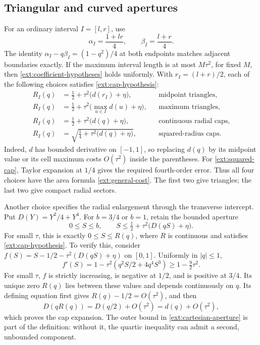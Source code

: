 \subsection{Triangular and curved apertures}
\label{ext:apertures}

For an ordinary interval $I=[l,r]$, use
\begin{equation}\label{ext:ordinary-secants}
 \alpha_I=\frac{1+lr}{4},\qquad \beta_I=\frac{l+r}{4}.
\end{equation}
The identity $\alpha_I-q\beta_I=(1-q^2)/4$ at both endpoints
matches adjacent boundaries exactly.  If the maximum interval length
is at most $M\tau^2$, for fixed $M$, then
\eqref{ext:coefficient-hypotheses} holds uniformly.
With $r_I=(l+r)/2$, each of the following choices satisfies
\eqref{ext:cap-hypothesis}:
\begin{align}
 R_I(q)&=\tfrac12+\tau^2\bigl(d(r_I)+\eta\bigr),
 &&\text{midpoint triangles},\label{ext:midpoint-cap}\\
 R_I(q)&=\tfrac12+\tau^2\bigl(\max_{u\in I}d(u)+\eta\bigr),
 &&\text{maximum triangles},\label{ext:maximum-cap}\\
 R_I(q)&=\tfrac12+\tau^2\bigl(d(q)+\eta\bigr),
 &&\text{continuous radial caps},\label{ext:radial-cap}\\
 R_I(q)&=\sqrt{\tfrac14+\tau^2\bigl(d(q)+\eta\bigr)},
 &&\text{squared-radius caps}.\label{ext:squared-cap}
\end{align}
Indeed, $d$ has bounded derivative on $[-1,1]$, so replacing $d(q)$
by its midpoint value or its cell maximum costs $O(\tau^2)$ inside
the parentheses.  For \eqref{ext:squared-cap}, Taylor expansion at
$1/4$ gives the required fourth-order error.  Thus all four choices
have the area formula \eqref{ext:general-cost}.  The first two give
triangles; the last two give compact radial sectors.

Another choice specifies the radial enlargement through the transverse
intercept.  Put $D(Y)=Y^2/4+Y^4$.  For $b=3/4$ or $b=1$, retain the
bounded aperture
\begin{equation}\label{ext:cartesian-aperture}
 0\le S\le b,\qquad S\le\tfrac12+\tau^2\bigl(D(qS)+\eta\bigr).
\end{equation}
For small $\tau$, this is exactly $0\le S\le R(q)$, where $R$ is
continuous and satisfies \eqref{ext:cap-hypothesis}.  To verify this,
consider $f(S)=S-1/2-\tau^2(D(qS)+\eta)$ on $[0,1]$.  Uniformly in
$|q|\le1$,
\[
 f'(S)=1-\tau^2(q^2S/2+4q^4S^3)\ge1-\tfrac92\tau^2.
\]
For small $\tau$, $f$ is strictly increasing, is negative at $1/2$,
and is positive at $3/4$.  Its unique zero $R(q)$ lies between these
values and depends continuously on $q$.  Its defining equation first
gives $R(q)-1/2=O(\tau^2)$, and then
\[
 D(qR(q))=D(q/2)+O(\tau^2)=d(q)+O(\tau^2),
\]
which proves the cap expansion.  The outer bound in
\eqref{ext:cartesian-aperture} is part of the definition: without it,
the quartic inequality can admit a second, unbounded component.

